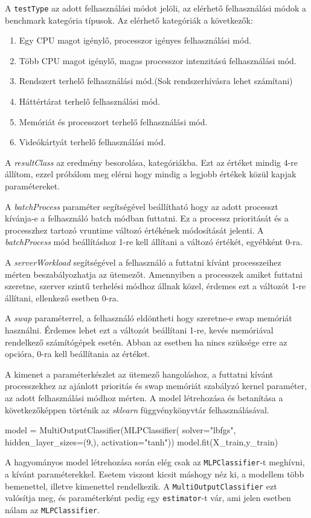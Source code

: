 A \texttt{testType} az adott felhasználási módot jelöli, az elérhető felhasználási módok a benchmark kategória típusok. Az elérhető kategóriák a következők: 
\begin{enumerate}
\item Egy CPU magot igénylő, processzor igényes felhasználási mód.
\item Több CPU magot igénylő, magas processzor intenzitású felhasználási mód.
\item Rendszert terhelő felhasználási mód.(Sok rendszerhívásra lehet számítani)
\item Háttértárat terhelő felhasználási mód.
\item Memóriát és processzort terhelő felhasználási mód.
\item Videókártyát terhelő felhasználási mód.
\end{enumerate}

A \textit{resultClass} az eredmény besorolása, kategóriákba. Ezt az értéket mindig 4-re állítom, ezzel próbálom meg elérni hogy mindig a legjobb értékek közül kapjak paramétereket.

A \textit{batchProcess} paraméter segítségével beállítható hogy az adott processzt kívánja-e a felhasználó batch módban futtatni. Ez a processz prioritását és a processzhez tartozó vruntime változó értékének módosítását jelenti. A \textit{batchProcess} mód beállításhoz 1-re kell állítani a változó értékét, egyébként 0-ra.

A \textit{serverWorkload} segítségével a felhasználó a futtatni kívánt processzeihez mérten beszabályozhatja az ütemezőt. Amennyiben a processzek amiket futtatni szeretne, szerver szintű terhelési módhoz állnak közel, érdemes ezt a változót 1-re állítani, ellenkező esetben 0-ra.

A \textit{swap} paraméterrel, a felhasználó eldöntheti hogy szeretne-e swap memóriát használni. Érdemes lehet ezt a változót beállítani 1-re, kevés memóriával rendelkező számítógépek esetén. Abban az esetben ha nincs szüksége erre az opcióra, 0-ra kell beállítania az értéket.

A kimenet a paraméterkészlet az ütemező hangoláshoz, a futtatni kívánt processzekhez az ajánlott prioritás és swap memóriát szabályzó kernel paraméter, az adott felhasználási módhoz mérten.
A model létrehozása és betanítása a következőképpen történik az \textit{sklearn} függvénykönyvtár felhasználásával. 
\begin{python}
model = MultiOutputClassifier(MLPClassifier(
	solver="lbfgs",
	hidden_layer_sizes=(9,),
	activation="tanh"))
model.fit(X_train,y_train)
\end{python}
A hagyományos model létrehozása során elég csak az \texttt{MLPClassifier}-t meghívni, a kívánt paraméterekkel. Esetem viszont kicsit máshogy néz ki, a modellem több bemenettel, illetve kimenettel rendelkezik. A \texttt{MultiOutputClassifier} ezt valósítja meg, és paraméterként pedig egy \texttt{estimator}-t vár, ami jelen esetben nálam az \texttt{MLPClassifier}.

